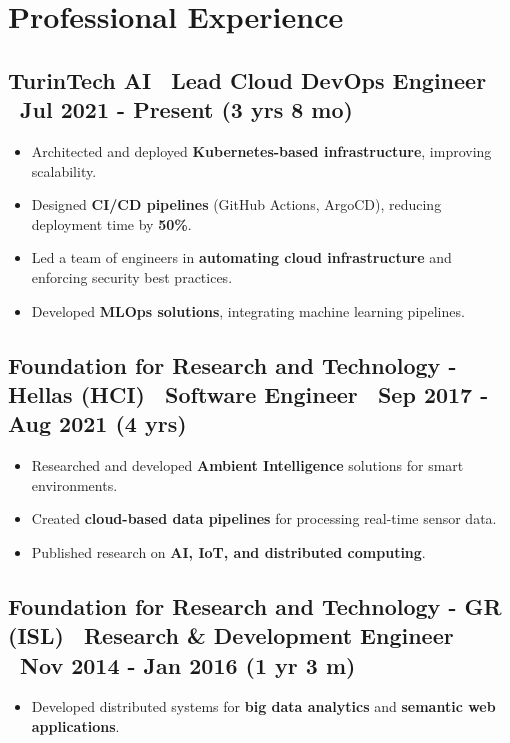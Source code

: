 \documentclass[a4paper,10pt]{article}
\begin{document}
\vspace{2pt}

\section*{ Professional Experience}

\subsection*{TurinTech AI \textbar\ Lead Cloud DevOps Engineer \textbar\ Jul 2021 - Present (3 yrs 8 mo)}
\begin{itemize}[left=0pt]
    \item Architected and deployed \textbf{Kubernetes-based infrastructure}, improving scalability.
    \item Designed \textbf{CI/CD pipelines} (GitHub Actions, ArgoCD), reducing deployment time by \textbf{50\%}.
    \item Led a team of engineers in \textbf{automating cloud infrastructure} and enforcing security best practices.
    \item Developed \textbf{MLOps solutions}, integrating machine learning pipelines.
\end{itemize}

\subsection*{Foundation for Research and Technology - Hellas (HCI) \textbar\ Software Engineer \textbar\ Sep 2017 - Aug 2021 (4 yrs)}
\begin{itemize}[left=0pt]
    \item Researched and developed \textbf{Ambient Intelligence} solutions for smart environments.
    \item Created \textbf{cloud-based data pipelines} for processing real-time sensor data.
    \item Published research on \textbf{AI, IoT, and distributed computing}.
\end{itemize}

\subsection*{Foundation for Research and Technology - GR (ISL) \textbar\ Research \& Development Engineer \textbar\ Nov 2014 - Jan 2016 (1 yr 3 m)}
\begin{itemize}[left=0pt]
    \item Developed distributed systems for \textbf{big data analytics} and \textbf{semantic web applications}.
\end{itemize}
\end{document}
